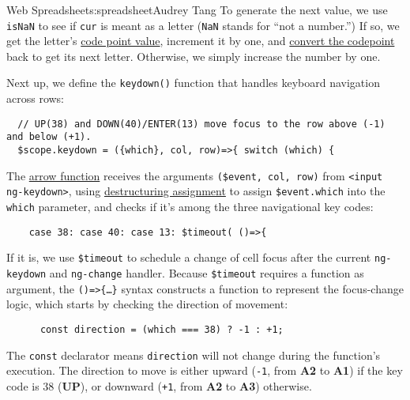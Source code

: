 \begin{aosachapter}{Web Spreadsheet}{s:spreadsheet}{Audrey Tang}
To generate the next value, we use \texttt{isNaN} to see if \texttt{cur}
is meant as a letter (\texttt{NaN} stands for ``not a number.'') If so,
we get the letter's
\href{https://developer.mozilla.org/en-US/docs/Web/JavaScript/Reference/Global_Objects/String/codePointAt}{code
point value}, increment it by one, and
\href{https://developer.mozilla.org/en-US/docs/Web/JavaScript/Reference/Global_Objects/String/fromCodePoint}{convert
the codepoint} back to get its next letter. Otherwise, we simply
increase the number by one.

Next up, we define the \texttt{keydown()} function that handles keyboard
navigation across rows:

\begin{verbatim}
  // UP(38) and DOWN(40)/ENTER(13) move focus to the row above (-1) and below (+1).
  $scope.keydown = ({which}, col, row)=>{ switch (which) {
\end{verbatim}

The
\href{https://developer.mozilla.org/en-US/docs/Web/JavaScript/Reference/arrow_functions}{arrow
function} receives the arguments \texttt{(\$event, col, row)} from
\texttt{\textless{}input ng-keydown\textgreater{}}, using
\href{https://developer.mozilla.org/en-US/docs/Web/JavaScript/New_in_JavaScript/1.7\#Pulling_fields_from_objects_passed_as_function_parameter}{destructuring
assignment} to assign \texttt{\$event.which} into the \texttt{which}
parameter, and checks if it's among the three navigational key codes:

\begin{verbatim}
    case 38: case 40: case 13: $timeout( ()=>{
\end{verbatim}

If it is, we use \texttt{\$timeout} to schedule a change of cell focus
after the current \texttt{ng-keydown} and \texttt{ng-change} handler.
Because \texttt{\$timeout} requires a function as argument, the
\texttt{()=\textgreater{}\{\ldots{}\}} syntax constructs a function to
represent the focus-change logic, which starts by checking the direction
of movement:

\begin{verbatim}
      const direction = (which === 38) ? -1 : +1;
\end{verbatim}

The \texttt{const} declarator means \texttt{direction} will not change
during the function's execution. The direction to move is either upward
(\texttt{-1}, from \textbf{A2} to \textbf{A1}) if the key code is 38
(\textbf{UP}), or downward (\texttt{+1}, from \textbf{A2} to
\textbf{A3}) otherwise.


\end{aosachapter}
